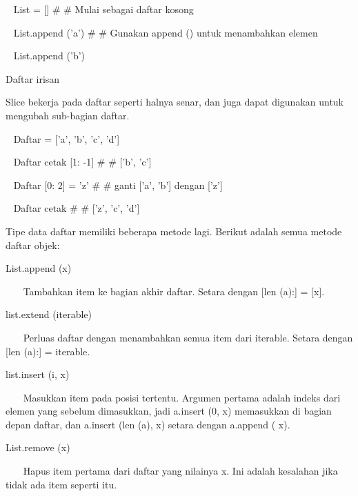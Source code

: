 \vspace{12pt}
~ List = []    \#     \#   Mulai sebagai daftar kosong \par
~ List.append ('a')    \#     \#   Gunakan append () untuk menambahkan elemen \par
~ List.append ('b') \par
\vspace{12pt}
Daftar irisan \par
\vspace{12pt}
Slice bekerja pada daftar seperti halnya senar, dan juga dapat digunakan untuk mengubah sub-bagian daftar. \par
\vspace{12pt}
~ Daftar = ['a', 'b', 'c', 'd'] \par
~ Daftar cetak [1: -1]    \#     \#   ['b', 'c'] \par
~ Daftar [0: 2] = 'z'    \#     \#   ganti ['a', 'b'] dengan ['z'] \par
~ Daftar cetak    \#     \#   ['z', 'c', 'd'] \par
Tipe data daftar memiliki beberapa metode lagi. Berikut adalah semua metode daftar objek: \par
\vspace{12pt}
List.append (x) \par
\vspace{12pt}
~~~ Tambahkan item ke bagian akhir daftar. Setara dengan [len (a):] = [x]. \par
\vspace{12pt}
list.extend (iterable) \par
\vspace{12pt}
~~~ Perluas daftar dengan menambahkan semua item dari iterable. Setara dengan [len (a):] = iterable. \par
\vspace{12pt}
list.insert (i, x) \par
\vspace{12pt}
~~~ Masukkan item pada posisi tertentu. Argumen pertama adalah indeks dari elemen yang sebelum dimasukkan, jadi a.insert (0, x) memasukkan di bagian depan daftar, dan a.insert (len (a), x) setara dengan a.append ( x). \par
\vspace{12pt}
List.remove (x) \par
\vspace{12pt}
~~~ Hapus item pertama dari daftar yang nilainya x. Ini adalah kesalahan jika tidak ada item seperti itu. \par
\vspace{12pt}
